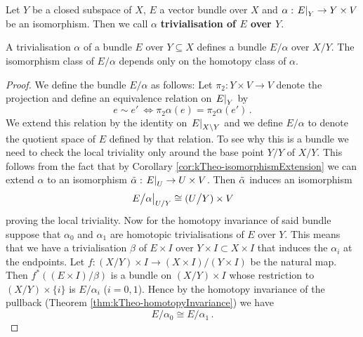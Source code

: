 \begin{definition}
		\label{def:kTheo-trivialisation}
	Let $Y$ be a closed subspace of $X$, $E$ a vector bundle over $X$ and $\alpha:\left.E\right|_{Y}\to Y\times V$ be an isomorphism. Then we call $\alpha$ \textbf{trivialisation of $E$ over $Y$}.
\end{definition} 




\begin{lemma}\label{lem:kTheo-trivialisationDefinesABundle}
	A trivialisation $\alpha$ of a bundle $E$ over $Y\subseteq X$ defines a bundle $E\big/ \alpha$ over $X\big/ Y$. The isomorphism class of $E\big/ \alpha$ depends only on the homotopy class of $\alpha$. 
\end{lemma}

\begin{proof}
	We define the bundle $E/ \alpha $ as follows: Let $\pi_2: Y \times V \to V$ denote the projection and define an equivalence relation on $\left.E\right|_{Y}$ by 
	\begin{equation*}
		e\sim e' ~ \Leftrightarrow \pi_2 \alpha (e) =\pi_2 \alpha (e') \, .
	\end{equation*} We extend this relation by the identity on $\left.E\right|_{X\setminus Y}$ and we define $E\big/\alpha$ to denote the quotient space of $E$ defined by that relation.
	To see why this is a bundle we need to check the local triviality only around the base point $Y \big/ Y$ of $X \big/ Y$. This follows from the fact that by Corollary \ref{cor:kTheo-isomorphismExtension} we can extend $\alpha$ to an isomorphism $\Tilde{\alpha}:\left.E\right|_{U}\to U \times V$. Then $\Tilde{\alpha}$ induces an isomorphism
	\begin{equation*}
		\left.E \big/ \alpha\right|_{U\slash Y} \cong  (U \big/ Y) \times V
	\end{equation*}
	proving the local triviality.
	Now for the homotopy invariance of said bundle suppose that $\alpha_0$ and $\alpha_1$ are homotopic trivialisations of $E$ over $Y$. This means that we have a trivialisation $\beta$ of $E \times I$ over $Y \times I\subset X \times I$ that induces the $\alpha_i$ at the endpoints. Let $f: (X \big/ Y)\times I\to (X\times I) \big/ (Y\times I)$ be the natural map. Then $f^*((E \times I) \big/  \beta)$ is a bundle on $(X \big/ Y)\times I$ whose restriction to $(X \big/  Y)\times \{i\}$ is $E \big/  \alpha_i$ ($i=0,1$). Hence by the homotopy invariance of the pullback (Theorem \ref{thm:kTheo-homotopyInvariance}) we have 
	\begin{equation*}
		E \big/ \alpha_0 \cong E \big/ \alpha _1\,.
	\end{equation*}
\end{proof}

